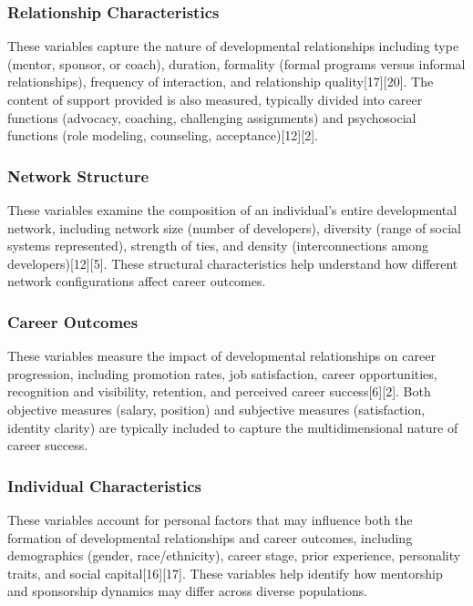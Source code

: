 \documentclass[
  letterpaper,
  DIV=11,
  numbers=noendperiod]{scrartcl}
\begin{document}
\subsubsection{Relationship
Characteristics}\label{relationship-characteristics}

These variables capture the nature of developmental relationships
including type (mentor, sponsor, or coach), duration, formality (formal
programs versus informal relationships), frequency of interaction, and
relationship quality{[}17{]}{[}20{]}. The content of support provided is
also measured, typically divided into career functions (advocacy,
coaching, challenging assignments) and psychosocial functions (role
modeling, counseling, acceptance){[}12{]}{[}2{]}.

\subsubsection{Network Structure}\label{network-structure}

These variables examine the composition of an individual's entire
developmental network, including network size (number of developers),
diversity (range of social systems represented), strength of ties, and
density (interconnections among developers){[}12{]}{[}5{]}. These
structural characteristics help understand how different network
configurations affect career outcomes.

\subsubsection{Career Outcomes}\label{career-outcomes}

These variables measure the impact of developmental relationships on
career progression, including promotion rates, job satisfaction, career
opportunities, recognition and visibility, retention, and perceived
career success{[}6{]}{[}2{]}. Both objective measures (salary, position)
and subjective measures (satisfaction, identity clarity) are typically
included to capture the multidimensional nature of career success.

\subsubsection{Individual
Characteristics}\label{individual-characteristics}

These variables account for personal factors that may influence both the
formation of developmental relationships and career outcomes, including
demographics (gender, race/ethnicity), career stage, prior experience,
personality traits, and social capital{[}16{]}{[}17{]}. These variables
help identify how mentorship and sponsorship dynamics may differ across
diverse populations.
\end{document}
